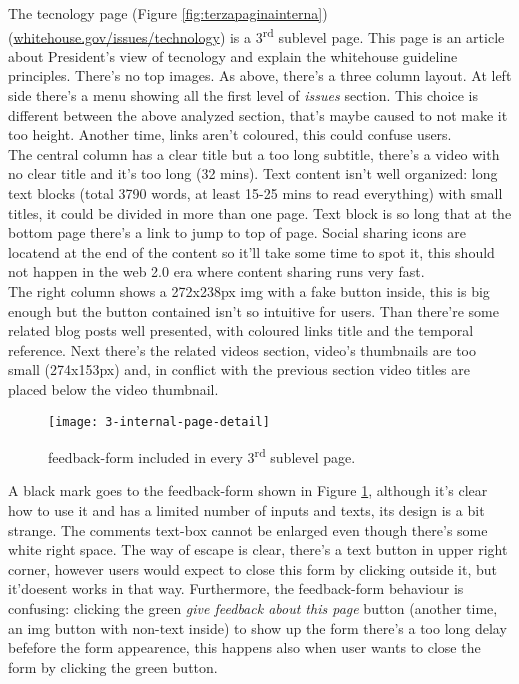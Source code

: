 \documentclass[
10pt, %
a4paper, %
oneside, %
headinclude,footinclude, %
BCOR5mm, %
]{scrartcl}
\begin{document}
	The tecnology page (Figure \ref{fig:terzapaginainterna}) (\href{http://www.whitehouse.gov/issues/technology}{whitehouse.gov/issues/technology}) is a 3\textsuperscript{rd} sublevel page. This page is an article about President's view of tecnology and explain the whitehouse guideline principles. There's no top images. As above, there's a three column layout. At left side there's a menu showing all the first level of \emph{issues} section. This choice is different between the above analyzed section, that's maybe caused to not make it too height. Another time, links aren't coloured, this could confuse users. \\
	The central column has a clear title but a too long subtitle, there's a video with no clear title and it's too long (32 mins). Text content isn't well organized: long text blocks (total 3790 words, at least 15-25 mins to read everything) with small titles, it could be divided in more than one page. Text block is so long that at the bottom page there's a link to jump to top of page. Social sharing icons are locatend at the end of the content so it'll take some time to spot it, this should not happen in the web 2.0 era where content sharing runs very fast. \\
	The right column shows a 272x238px img with a fake button inside, this is big enough but the button contained isn't so intuitive for users. Than there're some related blog posts well presented, with coloured links title and the temporal reference. Next there's the related videos section, video's thumbnails are too small (274x153px) and, in conflict with the previous section video titles are placed below the video thumbnail.
	
	\begin{figure}[h!]
	\centering 
	\centerline{\texttt{[image: 3-internal-page-detail]}}
	\caption[feedback-form]{feedback-form included in every 3\textsuperscript{rd} sublevel page.}
	\label{fig:terzapaginainternadettaglio} 
	\end{figure}

	A black mark goes to the feedback-form shown in Figure \ref{fig:terzapaginainternadettaglio}, although it's clear how to use it and has a limited number of inputs and texts, its design is a bit strange. The comments text-box cannot be enlarged even though there's some white right space. The way of escape is clear, there's a text button in upper right corner, however users would expect to close this form by clicking outside it, but it'doesent works in that way. Furthermore, the feedback-form behaviour is confusing: clicking the green \emph{give feedback about this page} button (another time, an img button with non-text inside) to show up the form there's a too long delay befefore the form appearence, this happens also when user wants to close the form by clicking the green button.
\end{document}
